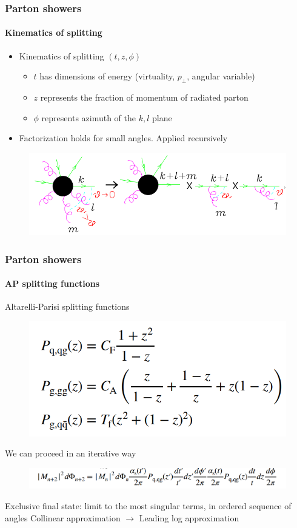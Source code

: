 \documentclass[aspectratio=43]{beamer}
\begin{document}
\begin{frame}

	\frametitle{Parton showers}
	\framesubtitle{Kinematics of splitting}
	
	\begin{itemize} 
		\item Kinematics of splitting $(t, z, \phi)$
		\begin{itemize}
			\item $t$ has dimensions of energy (virtuality, $p_{\perp}$, angular variable)
			\item $z$ represents the fraction of momentum of radiated parton
			\item $\phi$ represents azimuth of the $k, l$ plane
		\end{itemize}
	
	\vspace{0.5cm}
	
		\item Factorization holds for small angles. Applied recursively
	\end{itemize}
	
	\begin{figure}
		\includegraphics[width = 7 cm]{plots/shower_4.png}
	\end{figure}

\end{frame}

\begin{frame}

	\frametitle{Parton showers}
	\framesubtitle{AP splitting functions}
	
	Altarelli-Parisi splitting functions
	
	\begin{figure}
		\includegraphics[width = 5 cm]{plots/AP_splitting.png}
	\end{figure}

	We can proceed in an iterative way
	\begin{figure}
		\includegraphics[width = 9 cm]{plots/AP_iteration.png}
	\end{figure}

	\footnotesize Exclusive final state: limit to the most singular terms, in ordered sequence of angles
	\color{red} Collinear approximation $\longrightarrow$ Leading log approximation
	
\end{frame}
\end{document}
